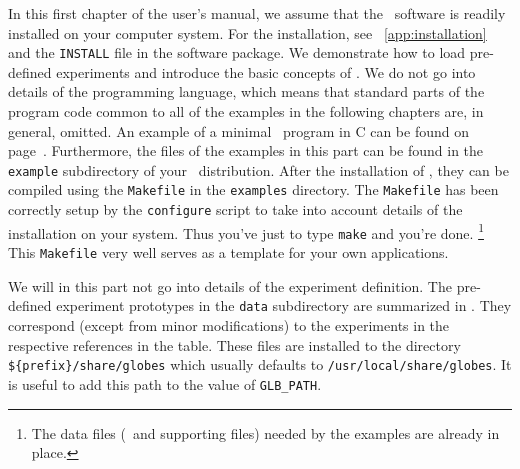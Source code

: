 In this first chapter of the user's manual, we assume that the \GLOBES\ 
software is readily installed on your computer system. For the installation,
see \App~\ref{app:installation} and the {\tt INSTALL} file in the
software package. We demonstrate how to load pre-defined experiments 
and introduce the basic concepts of \GLOBES . We do not go
into details of the programming language, which means that standard parts
of the program code common to all of the examples in the following chapters 
are, in general, omitted.
An example of a minimal \GLOBES\ program in C can be found on 
page~\pageref{ex:c}. Furthermore, the files of the examples in this part 
can be found in the \verb+example+ subdirectory of your \GLOBES\ distribution.
 \index{norm}{Examples} 
After the installation of \GLOBES, they can be compiled using 
the \verb+Makefile+ in the \verb+examples+
 directory. The  \verb+Makefile+ has been correctly setup by the 
\verb+configure+
script to take into account details of the installation on your system. Thus
you've just to type \verb+make+ and you're done.
\footnote{The  data files (\AEDL\ and supporting files) needed by the
examples are already in place.} This \verb+Makefile+ very well serves
as a template for your own applications.

We will in this part not go into details of the experiment
definition. The pre-defined experiment prototypes in the {\tt data}
subdirectory are summarized in \tabl{experiments}. They correspond
(except from minor modifications) to the experiments in the
respective references in the table. These files are installed to
the directory \verb+${prefix}/share/globes+ which usually defaults
to  \verb+/usr/local/share/globes+. It is useful to add this path
to the value of \verb+GLB_PATH+.


